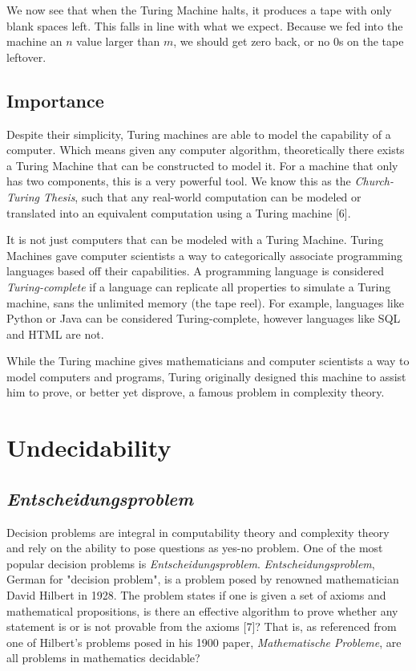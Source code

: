 \documentclass[11pt]{article}
\begin{document}
\noindent We now see that when the Turing Machine halts, it produces a tape with only blank spaces left. This falls in line with what we expect. Because we fed into the machine an $n$ value larger than $m$, we should get zero back, or no $0$s on the tape leftover.


\subsection{Importance}

Despite their simplicity, Turing machines are able to model the capability of a computer. Which means given any computer algorithm, theoretically there exists a Turing Machine that can be constructed to model it. For a machine that only has two components, this is a very powerful tool. We know this as the \textit{Church-Turing Thesis}, such that any real-world computation can be modeled or translated into an equivalent computation using a Turing machine [6].

It is not just computers that can be modeled with a Turing Machine. Turing Machines gave computer scientists a way to categorically associate programming languages based off their capabilities. A programming language is considered \textit{Turing-complete} if a language can replicate all properties to simulate a Turing machine, sans the unlimited memory (the tape reel). For example, languages like Python or Java can be considered Turing-complete, however languages like SQL and HTML are not.

While the Turing machine gives mathematicians and computer scientists a way to model computers and programs, Turing originally designed this machine to assist him to prove, or better yet disprove, a famous problem in complexity theory.


\section{Undecidability}

\subsection{\textit{Entscheidungsproblem}}

Decision problems are integral in computability theory and complexity theory and rely on the ability to pose questions as yes-no problem. One of the most popular decision problems is \textit{Entscheidungsproblem}. \textit{Entscheidungsproblem}, German for "decision problem", is a problem posed by renowned mathematician David Hilbert in 1928. The problem states if one is given a set of axioms and mathematical propositions, is there an effective algorithm to prove whether any statement is or is not provable from the axioms [7]? That is, as referenced from one of Hilbert's problems posed in his 1900 paper, \textit{Mathematische Probleme}, are all problems in mathematics decidable?
\end{document}
